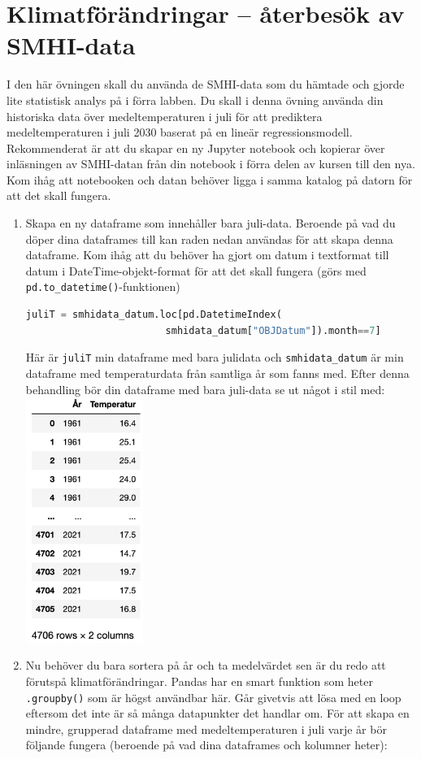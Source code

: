 \documentclass{article}
\begin{document}
\section{Klimatförändringar -- återbesök av SMHI-data}
I den här övningen skall du använda de SMHI-data som du hämtade och gjorde lite statistisk analys på i förra labben. Du skall i denna övning använda din historiska data över medeltemperaturen i juli för att prediktera medeltemperaturen i juli 2030 baserat på en lineär regressionsmodell. Rekommenderat är att du skapar en ny Jupyter notebook och kopierar över inläsningen av SMHI-datan från din notebook i förra delen av kursen till den nya. Kom ihåg att notebooken och datan behöver ligga i samma katalog på datorn för att det skall fungera.
\begin{enumerate}
    \item Skapa en ny dataframe som innehåller bara juli-data. Beroende på vad du döper dina dataframes till kan raden nedan användas för att skapa denna dataframe. Kom ihåg att du behöver ha gjort om datum i textformat till datum i DateTime-objekt-format för att det skall fungera (görs med \texttt{pd.to\_datetime()}-funktionen)
    \begin{lstlisting}[language=Python]
juliT = smhidata_datum.loc[pd.DatetimeIndex(
                        smhidata_datum["OBJDatum"]).month==7]        
\end{lstlisting}
    Här är \texttt{juliT} min dataframe med bara julidata och \texttt{smhidata\_datum} är min dataframe med temperaturdata från samtliga år som fanns med. Efter denna behandling bör din dataframe med bara juli-data se ut något i stil med:\\
    \includegraphics[width=0.3\textwidth]{figures/julitemp.png}
    \item Nu behöver du bara sortera på år och ta medelvärdet sen är du redo att förutspå klimatförändringar. Pandas har en smart funktion som heter \texttt{.groupby()} som är högst användbar här. Går givetvis att lösa med en loop eftersom det inte är så många datapunkter det handlar om. För att skapa en mindre, grupperad dataframe med medeltemperaturen i juli varje år bör följande fungera (beroende på vad dina dataframes och kolumner heter):

\end{enumerate}
\end{document}
